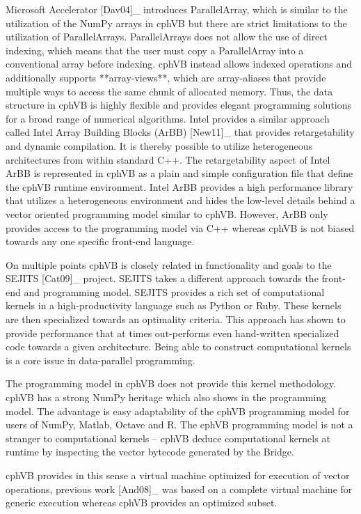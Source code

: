 Microsoft Accelerator [Dav04]_ introduces ParallelArray, which is similar to the utilization of the NumPy arrays in cphVB but there are strict limitations to the utilization of ParallelArrays. ParallelArrays does not allow the use of direct indexing, which means that the user must copy a ParallelArray into a conventional array before indexing. cphVB instead allows indexed operations and additionally supports **array-views**, which are array-aliases that provide multiple ways to access the same chunk of allocated memory. Thus, the data structure in cphVB is highly flexible and provides elegant programming solutions for a broad range of numerical algorithms. 
Intel provides a similar approach called Intel Array Building Blocks (ArBB) [New11]_ that provides retargetability and dynamic compilation. It is thereby possible to utilize heterogeneous architectures from within standard C++.
The retargetability aspect of Intel ArBB is represented in cphVB as a plain and simple configuration file that define the cphVB runtime environment. Intel ArBB provides a high performance library that utilizes a heterogeneous environment and hides the low-level details behind a vector oriented programming model similar to cphVB. However, ArBB only provides access to the programming model via C++ whereas cphVB is not biased towards any one specific front-end language.

On multiple points cphVB is closely related in functionality and goals to the SEJITS [Cat09]_ project. SEJITS takes a different approach towards the front-end and programming model. SEJITS provides a rich set of computational kernels in a high-productivity language such as Python or Ruby. These kernels are then specialized towards an optimality criteria. This approach has shown to provide performance that at times out-performs even hand-written specialized code towards a given architecture. Being able to construct computational kernels is a core issue in data-parallel programming. 

The programming model in cphVB does not provide this kernel methodology. cphVB has a strong NumPy heritage which also shows in the programming model. The advantage is easy adaptability of the cphVB programming model for users of NumPy, Matlab, Octave and R. The cphVB programming model is not a stranger to computational kernels – cphVB deduce computational kernels at runtime by inspecting the vector bytecode generated by the Bridge.

cphVB provides in this sense a virtual machine optimized for execution of vector operations, previous work [And08]_ was based on a complete virtual machine for generic execution whereas cphVB provides an optimized subset.

